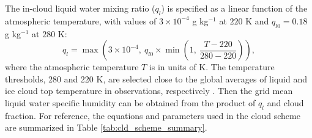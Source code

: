 The in-cloud liquid water mixing ratio ($q_l$) is specified as a linear function of the atmospheric temperature, with values of $3\times 10^{-4}$ g kg$^{-1}$ at $220$ K and $q_{l0}=0.18$ g kg$^{-1}$ at $280$ K:
\begin{equation}
	q_l = \max\left(3\times 10^{-4}, ~q_{l0}\times  \min\left(1, ~\frac{T-220}{280-220}\right)\right),
	\label{eq:qcl}
\end{equation}
where the atmospheric temperature $T$ is in units of K. The temperature thresholds, 280 and 220 K,  are selected close to the global averages of liquid and ice cloud top temperature in observations, respectively \citep[Fig. 4 in][]{Stubenrauch2013}. Then the grid mean liquid water specific humidity can be obtained from the product of $q_l$ and cloud fraction. For reference, the equations and parameters used in the cloud scheme are summarized in Table \ref{tab:cld_scheme_summary}. 


